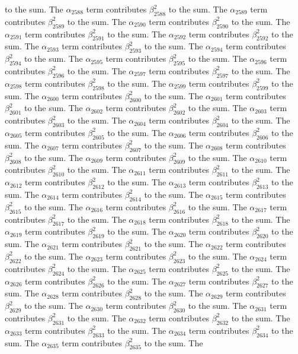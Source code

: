 \begin{lemma}
to the sum. The $\alpha_{2588}$ term contributes $\beta_{2588}^{2}$ to the sum. The $\alpha_{2589}$ term contributes $\beta_{2589}^{2}$ to the sum. The $\alpha_{2590}$ term contributes $\beta_{2590}^{2}$ to the sum. The $\alpha_{2591}$ term contributes $\beta_{2591}^{2}$ to the sum. The $\alpha_{2592}$ term contributes $\beta_{2592}^{2}$ to the sum. The $\alpha_{2593}$ term contributes $\beta_{2593}^{2}$ to the sum. The $\alpha_{2594}$ term contributes $\beta_{2594}^{2}$ to the sum. The $\alpha_{2595}$ term contributes $\beta_{2595}^{2}$ to the sum. The $\alpha_{2596}$ term contributes $\beta_{2596}^{2}$ to the sum. The $\alpha_{2597}$ term contributes $\beta_{2597}^{2}$ to the sum. The $\alpha_{2598}$ term contributes $\beta_{2598}^{2}$ to the sum. The $\alpha_{2599}$ term contributes $\beta_{2599}^{2}$ to the sum. The $\alpha_{2600}$ term contributes $\beta_{2600}^{2}$ to the sum. The $\alpha_{2601}$ term contributes $\beta_{2601}^{2}$ to the sum. The $\alpha_{2602}$ term contributes $\beta_{2602}^{2}$ to the sum. The $\alpha_{2603}$ term contributes $\beta_{2603}^{2}$ to the sum. The $\alpha_{2604}$ term contributes $\beta_{2604}^{2}$ to the sum. The $\alpha_{2605}$ term contributes $\beta_{2605}^{2}$ to the sum. The $\alpha_{2606}$ term contributes $\beta_{2606}^{2}$ to the sum. The $\alpha_{2607}$ term contributes $\beta_{2607}^{2}$ to the sum. The $\alpha_{2608}$ term contributes $\beta_{2608}^{2}$ to the sum. The $\alpha_{2609}$ term contributes $\beta_{2609}^{2}$ to the sum. The $\alpha_{2610}$ term contributes $\beta_{2610}^{2}$ to the sum. The $\alpha_{2611}$ term contributes $\beta_{2611}^{2}$ to the sum. The $\alpha_{2612}$ term contributes $\beta_{2612}^{2}$ to the sum. The $\alpha_{2613}$ term contributes $\beta_{2613}^{2}$ to the sum. The $\alpha_{2614}$ term contributes $\beta_{2614}^{2}$ to the sum. The $\alpha_{2615}$ term contributes $\beta_{2615}^{2}$ to the sum. The $\alpha_{2616}$ term contributes $\beta_{2616}^{2}$ to the sum. The $\alpha_{2617}$ term contributes $\beta_{2617}^{2}$ to the sum. The $\alpha_{2618}$ term contributes $\beta_{2618}^{2}$ to the sum. The $\alpha_{2619}$ term contributes $\beta_{2619}^{2}$ to the sum. The $\alpha_{2620}$ term contributes $\beta_{2620}^{2}$ to the sum. The $\alpha_{2621}$ term contributes $\beta_{2621}^{2}$ to the sum. The $\alpha_{2622}$ term contributes $\beta_{2622}^{2}$ to the sum. The $\alpha_{2623}$ term contributes $\beta_{2623}^{2}$ to the sum. The $\alpha_{2624}$ term contributes $\beta_{2624}^{2}$ to the sum. The $\alpha_{2625}$ term contributes $\beta_{2625}^{2}$ to the sum. The $\alpha_{2626}$ term contributes $\beta_{2626}^{2}$ to the sum. The $\alpha_{2627}$ term contributes $\beta_{2627}^{2}$ to the sum. The $\alpha_{2628}$ term contributes $\beta_{2628}^{2}$ to the sum. The $\alpha_{2629}$ term contributes $\beta_{2629}^{2}$ to the sum. The $\alpha_{2630}$ term contributes $\beta_{2630}^{2}$ to the sum. The $\alpha_{2631}$ term contributes $\beta_{2631}^{2}$ to the sum. The $\alpha_{2632}$ term contributes $\beta_{2632}^{2}$ to the sum. The $\alpha_{2633}$ term contributes $\beta_{2633}^{2}$ to the sum. The $\alpha_{2634}$ term contributes $\beta_{2634}^{2}$ to the sum. The $\alpha_{2635}$ term contributes $\beta_{2635}^{2}$ to the sum. The 
\end{lemma}
